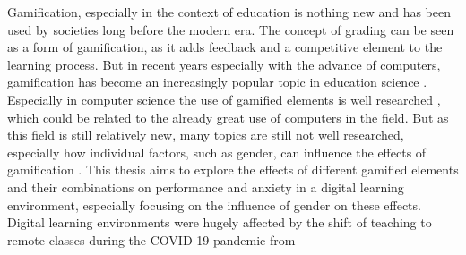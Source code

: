Gamification, especially in the context of education is nothing new and has been used by societies long before the modern era.
The concept of grading can be seen as a form of gamification, as it adds feedback and a competitive element to the learning process.
But in recent years especially with the advance of computers, gamification has become an increasingly popular topic in education science \parencite{swachaStateResearchGamification2021}.
Especially in computer science the use of gamified elements is well researched \parencite{dichevGamifyingEducationWhat2017}, which could be related to the already great use of computers in the field.
But as this field is still relatively new, many topics are still not well researched, especially how individual factors, such as gender, can influence the effects of gamification \parencite{dehghanzadehUsingGamificationSupport2024,oliveiraTailoredGamificationEducation2023}.
This thesis aims to explore the effects of different gamified elements and their combinations on performance and anxiety in a digital learning environment, especially focusing on the influence of gender on these effects.
Digital learning environments were hugely affected by the shift of teaching to remote classes during the COVID-19 pandemic from 